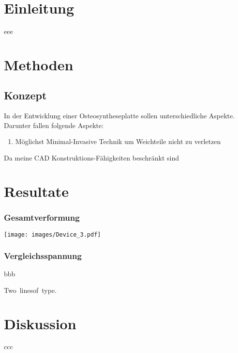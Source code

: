 
\section{Einleitung}

eee

\section{Methoden}


	\subsection{Konzept}
	
		In der Entwicklung einer Osteosyntheseplatte sollen unterschiedliche Aspekte.
		Darunter fallen folgende Aspekte:
		
		\begin{enumerate}
			\setlength{\itemsep}{0mm}
			\setlength{\parskip}{1mm}
			\item Möglichst Minimal-Invasive Technik um Weichteile nicht zu verletzen
		\end{enumerate}
		
		Da meine CAD Konstruktions-Fähigkeiten beschränkt sind 	


\section{Resultate}

	\subsubsection{Gesamtverformung}
	
		\begin{Figure}
			\centering
			\texttt{[image: images/Device\_3.pdf]}
			\label{fig:device3}
			\vspace*{0.5mm}
		\end{Figure}
	
	\subsubsection{Vergleichsspannung}



bbb

\vbox{\hbox{Two lines}\hbox{of type.}}



\section{Diskussion}

ccc

